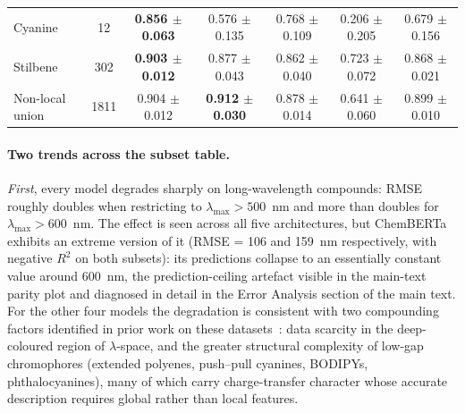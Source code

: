 \documentclass[journal=jcisd8,manuscript=suppinfo]{achemso}
\begin{document}
\begin{table}[htbp]
\begin{tabular}{lcccccc}
Cyanine & 12 & \textbf{0.856 $\pm$ 0.063} & 0.576 $\pm$ 0.135 & 0.768 $\pm$ 0.109 & 0.206 $\pm$ 0.205 & 0.679 $\pm$ 0.156 \\
Stilbene & 302 & \textbf{0.903 $\pm$ 0.012} & 0.877 $\pm$ 0.043 & 0.862 $\pm$ 0.040 & 0.723 $\pm$ 0.072 & 0.868 $\pm$ 0.021 \\
Non-local union & 1811 & 0.904 $\pm$ 0.012 & \textbf{0.912 $\pm$ 0.030} & 0.878 $\pm$ 0.014 & 0.641 $\pm$ 0.060 & 0.899 $\pm$ 0.010 \\
\bottomrule
\end{tabular}
\end{table}

\paragraph{Two trends across the subset table.}

\textit{First}, every model degrades sharply on long-wavelength compounds: RMSE roughly doubles when restricting to $\lambda_{\max} > 500$~nm and more than doubles for $\lambda_{\max} > 600$~nm. The effect is seen across all five architectures, but ChemBERTa exhibits an extreme version of it (RMSE = 106 and 159~nm respectively, with negative $R^2$ on both subsets): its predictions collapse to an essentially constant value around 600~nm, the prediction-ceiling artefact visible in the main-text parity plot and diagnosed in detail in the Error Analysis section of the main text. For the other four models the degradation is consistent with two compounding factors identified in prior work on these datasets~\cite{beard2019comparative,joung2021deep}: data scarcity in the deep-coloured region of $\lambda$-space, and the greater structural complexity of low-gap chromophores (extended polyenes, push--pull cyanines, BODIPYs, phthalocyanines), many of which carry charge-transfer character whose accurate description requires global rather than local features.
\end{document}
